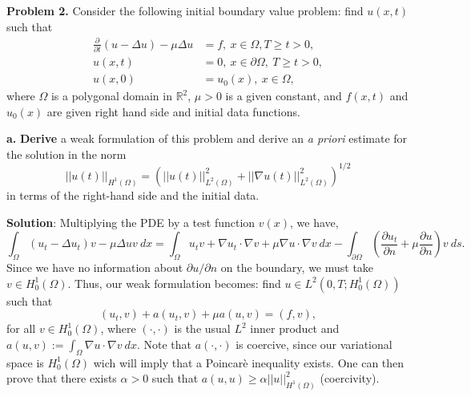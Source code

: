 \documentclass[11pt]{article}
\begin{document}
\newpage



{\bf Problem 2.} Consider the following initial boundary value problem: find $u(x,t)$ such that 
\begin{align*}
\frac{\partial}{\partial t}(u - \Delta u) - \mu \Delta u &= f, \: x \in \Omega, T \geq t > 0, \\
u(x,t) &= 0, \: x\in \partial\Omega, \: T \geq t > 0, \\
u(x,0) &= u_0(x), \: x \in \Omega,
\end{align*}
where $\Omega$ is a polygonal domain in $\mathbb{R}^2$, $\mu > 0$ is a given constant, and $f(x,t)$ and $u_0(x)$ are given right hand side and initial data functions.

\vskip 1cm


{\bf a.} {\bf Derive} a weak formulation of this problem and derive an {\it a priori} estimate for the solution in the norm 
\begin{equation*}
||u(t)||_{H^1(\Omega)} = (||u(t)||^2_{L^2(\Omega)} + ||\nabla u(t)||^2_{L^2(\Omega)} )^{1/2}
\end{equation*}
in terms of the right-hand side and the initial data.

\vskip 1cm

{\bf Solution}: Multiplying the PDE by a test function $v(x)$, we have,
\begin{equation*}
    \int_\Omega (u_t - \Delta u_t) v - \mu \Delta u v \: dx 
    = \int_\Omega u_t v + \nabla u_t \cdot \nabla v + \mu \nabla u \cdot \nabla v \: dx - \int_{\partial \Omega} (\frac{\partial u_t}{\partial n} + \mu \frac{\partial u}{\partial n} ) v \: ds.
\end{equation*} 
Since we have no information about $\partial u/\partial n$ on the boundary, we must take $v \in H^1_0(\Omega)$.
Thus, our weak formulation becomes: find $u \in L^2(0,T;H^1_0(\Omega))$ such that 
\begin{equation*}
    (u_t, v) + a(u_t, v) + \mu a(u,v) = (f,v),
\end{equation*}
for all $v \in H^1_0(\Omega)$, where $(\cdot, \cdot)$ is the usual $L^2$ inner product and $a(u,v) := \int_\Omega \nabla u \cdot \nabla v \: dx$.
Note that $a(\cdot, \cdot)$ is coercive, since our variational space is $H^1_0(\Omega)$ wich will imply that a Poincar\`{e} inequality exists.
One can then prove that there exists $\alpha > 0$ such that $a(u,u) \geq \alpha ||u||^2_{H^1(\Omega)}$ (coercivity).
\end{document}
